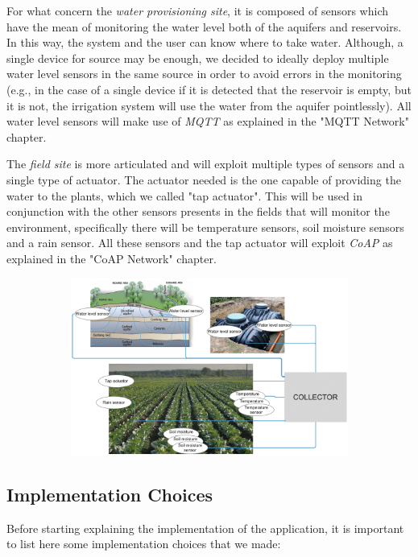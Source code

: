For what concern the \textit{water provisioning site}, it is composed of sensors which have the mean of monitoring the water level both of the aquifers and reservoirs. In this way, the system and the user can know where to take water. Although, a single device for source may be enough, we decided to ideally deploy multiple water level sensors in the same source in order to avoid errors in the monitoring (e.g., in the case of a single device if it is detected that the reservoir is empty, but it is not, the irrigation system will use the water from the aquifer pointlessly).
All water level sensors will make use of \textit{MQTT} as explained in the "MQTT Network" chapter.


The \textit{field site} is more articulated and will exploit multiple types of sensors and a single type of actuator. The actuator needed is the one capable of providing the water to the plants, which we called "tap actuator". This will be used in conjunction with the other sensors presents in the fields that will monitor the environment, specifically there will be temperature sensors, soil moisture sensors and a rain sensor. 
All these sensors and the tap actuator will exploit \textit{CoAP} as explained in the "CoAP Network" chapter.


\begin{figure}[H]
	\begin{subfigure}{\textwidth}
	\centering
		\includegraphics[width=1\linewidth]{img/deployment.png} 
	\end{subfigure}
\end{figure}



\subsection{Implementation Choices}
Before starting explaining the implementation of the application, it is important to list here some implementation choices that we made:

